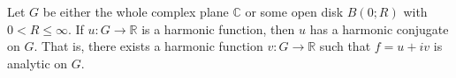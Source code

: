 Let $G$ be either the whole complex plane $\mathbb{C}$ or some open disk $B(0; R)$ with $0 < R \leq \infty$. If $u : G \to \mathbb{R}$ is a harmonic function, then $u$ has a harmonic conjugate on $G$. That is, there exists a harmonic function $v : G \to \mathbb{R}$ such that $f = u + iv$ is analytic on $G$.
